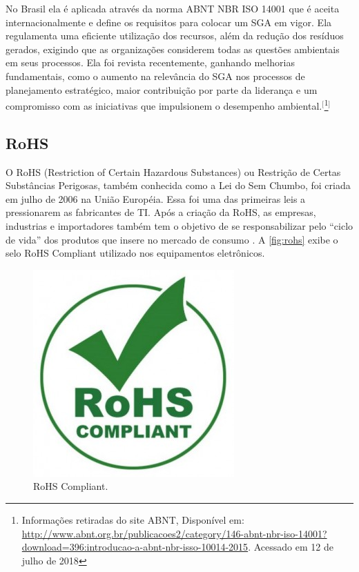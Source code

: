No Brasil ela é aplicada através da norma ABNT NBR ISO 14001 que é aceita internacionalmente e define os requisitos para colocar um  SGA em vigor. Ela regulamenta uma eficiente utilização dos recursos, além da redução dos resíduos gerados, exigindo que as organizações considerem todas as questões ambientais em seus processos. Ela foi revista recentemente, ganhando melhorias fundamentais, como o aumento na relevância do SGA nos processos de planejamento estratégico, maior contribuição por parte da liderança e um compromisso com as iniciativas que impulsionem o desempenho ambiental.$^{[}$\footnote{Informações retiradas do site ABNT, Disponível em: \url{http://www.abnt.org.br/publicacoes2/category/146-abnt-nbr-iso-14001?download=396:introducao-a-abnt-nbr-isso-10014-2015}.  Acessado em 12 de julho de 2018}$^{]}$
    
\subsection{RoHS}

O RoHS (Restriction of Certain Hazardous Substances) ou Restrição de Certas Substâncias Perigosas, também conhecida como a Lei do Sem Chumbo, foi criada em julho de 2006 na União Européia. Essa foi uma das primeiras leis a pressionarem as fabricantes de TI. Após a criação da RoHS, as empresas, industrias e importadores também tem o objetivo de se responsabilizar pelo “ciclo de vida” dos produtos que insere no mercado de consumo \cite{garcia2015tecnologia}. A \autoref{fig:rohs} exibe o selo RoHS Compliant utilizado nos equipamentos eletrônicos.

\begin{figure}[htb]
	\caption{\label{fig:rohs}RoHS Compliant.}
	\begin{center}
	    \includegraphics[scale=0.35]{imagens/rohs.jpg}
	\end{center}
\end{figure}

